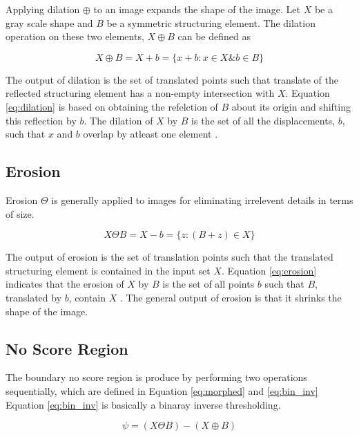Applying dilation $\oplus$ to an image expands the shape of the image. Let $X$ be a gray scale shape and $B$ be a symmetric structuring element. The dilation operation 
on these two elements, $X \oplus B$ can be defined as 

\begin{equation} \label{eq:dilation}
    X \oplus B = X + b = \{ x+ b : x \in X \& b \in B \} 
\end{equation}


The output of dilation is the set of translated points such that translate of the reflected structuring element has a non-empty intersection with $X$. Equation 
\ref{eq:dilation} is based on obtaining the refelction of $B$ about its origin and shifting this reflection by $b$. The dilation of $X$ by $B$ is the set of all the 
displacements, $b$, such that $x$ and $b$ overlap by atleast one element \cite{tambe2013image}.

\subsection{Erosion}

Erosion $\Theta$ is generally applied to images for eliminating irrelevent details in terms of size. 

\begin{equation} \label{eq:erosion}
    X \Theta B = X - b = \{ z: (  B + z )  \in X \} 
\end{equation}

The output of erosion is the set of translation points such that the translated structuring element is contained in the input set $X$. Equation \ref{eq:erosion} indicates 
that the erosion of $X$ by $B$ is the set of all points $b$ such that $B$, translated by $b$, contain $X$ \cite{tambe2013image}. The general output of erosion is that it 
shrinks the shape of the image. 

\subsection{No Score Region}

The boundary no score region is produce by performing two operations sequentially, which are defined in Equation \ref{eq:morphed} and \ref{eq:bin_inv}
Equation \ref{eq:bin_inv} is basically a binaray inverse thresholding.

\begin{equation} \label{eq:morphed}
    \psi = ( X \Theta B ) - ( X \oplus B)
\end{equation}

